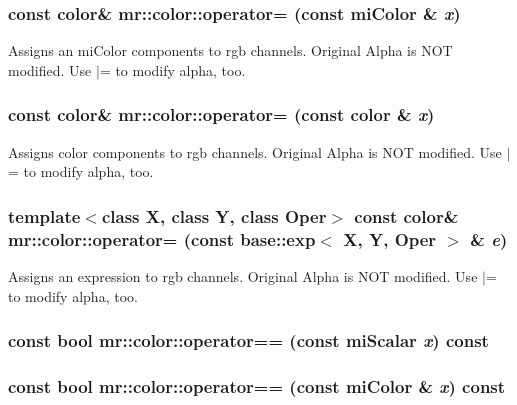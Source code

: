 \subsubsection{\setlength{\rightskip}{0pt plus 5cm}const {\bf color}\& mr::color::operator= (const mi\-Color \& {\em x})\hspace{0.3cm}{\tt  [inline]}}\label{structmr_1_1color_z5_2}


Assigns an mi\-Color components to rgb channels. Original Alpha is NOT modified. Use $|$= to modify alpha, too. 
\subsubsection{\setlength{\rightskip}{0pt plus 5cm}const {\bf color}\& mr::color::operator= (const {\bf color} \& {\em x})\hspace{0.3cm}{\tt  [inline]}}\label{structmr_1_1color_z5_1}


Assigns color components to rgb channels. Original Alpha is NOT modified. Use $|$= to modify alpha, too. 
\subsubsection{\setlength{\rightskip}{0pt plus 5cm}template$<$class X, class Y, class Oper$>$ const {\bf color}\& mr::color::operator= (const {\bf base::exp}$<$ X, Y, Oper $>$ \& {\em e})\hspace{0.3cm}{\tt  [inline]}}\label{structmr_1_1color_z5_0}


Assigns an expression to rgb channels. Original Alpha is NOT modified. Use $|$= to modify alpha, too. 
\subsubsection{\setlength{\rightskip}{0pt plus 5cm}const bool mr::color::operator== (const mi\-Scalar {\em x}) const\hspace{0.3cm}{\tt  [inline]}}\label{structmr_1_1color_z10_2}


\subsubsection{\setlength{\rightskip}{0pt plus 5cm}const bool mr::color::operator== (const mi\-Color \& {\em x}) const\hspace{0.3cm}{\tt  [inline]}}\label{structmr_1_1color_z10_1}


